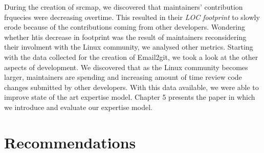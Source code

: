 \label{sec:expertise_model}


During the creation of srcmap, we discovered that maintainers' contribution frquecies were decreasing overtime. This resulted in their \textit{LOC footprint} to slowly erode because of the contributions coming from other developers. Wondering whether htis decrease in footprint was the result of maintainers reconsidering their involment with the Linux community, we analysed other metrics. Starting with the data collected for the creation of Email2git, we took a look at the other aspects of development. We discovered that as the Linux community becomes larger, maintainers are spending and increasing amount of time review code changes submitted by other developers. With this data available, we were able to improve state of the art expertise model. Chapter 5 presents the paper in which we introduce and evaluate our expertise model. 



\section{Recommendations}

